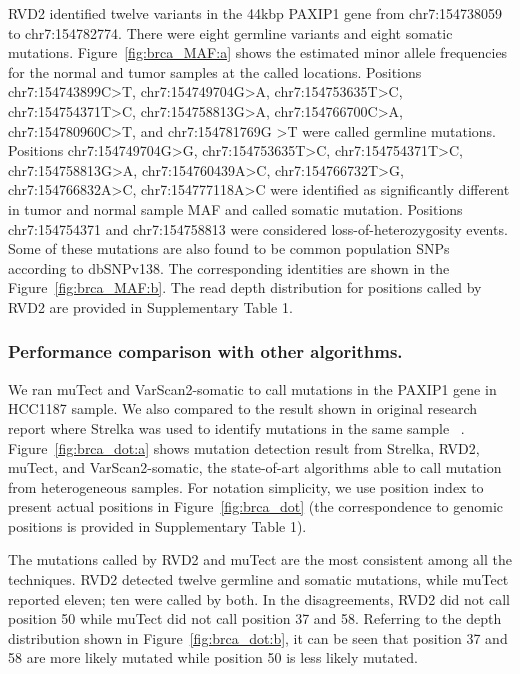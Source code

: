 \documentclass{bioinfo}
\begin{document}
RVD2 identified twelve variants in the 44kbp PAXIP1 gene from chr7:154738059 to chr7:154782774. There were eight germline variants and eight somatic mutations. %
Figure~\ref{fig:brca_MAF:a} shows the estimated minor allele frequencies for the normal and tumor samples at the called locations. Positions chr7:154743899C\textgreater T, chr7:154749704G\textgreater A, chr7:154753635T\textgreater C, chr7:154754371T\textgreater C, chr7:154758813G\textgreater A, chr7:154766700C\textgreater A, chr7:154780960C\textgreater T, and chr7:154781769G \textgreater T were called germline mutations. Positions chr7:154749704G\textgreater G, chr7:154753635T\textgreater C, chr7:154754371T\textgreater C, chr7:154758813G\textgreater A, chr7:154760439A\textgreater C, chr7:154766732T\textgreater G,  chr7:154766832A\textgreater C, chr7:154777118A\textgreater C were identified as significantly different in tumor and normal sample MAF and called somatic mutation. Positions chr7:154754371 and chr7:154758813 were considered loss-of-heterozygosity events. Some of these mutations are also found to be common population SNPs according to dbSNPv138. The corresponding identities are shown in the Figure~\ref{fig:brca_MAF:b}. The read depth distribution for positions called by RVD2 are provided in Supplementary Table 1. 

\subsubsection{Performance comparison with other algorithms.}

We ran muTect and VarScan2-somatic to call mutations in the PAXIP1 gene in HCC1187 sample. We also compared to the result shown in original research report where Strelka was used to identify mutations in the same sample ~\citep{hcc1187techreport}. Figure~\ref{fig:brca_dot:a} shows mutation detection result from Strelka, RVD2, muTect, and VarScan2-somatic, the state-of-art algorithms able to call mutation from heterogeneous samples. For notation simplicity, we use position index to present actual positions in Figure~\ref{fig:brca_dot} (the correspondence to genomic positions is provided in Supplementary Table 1). 

The mutations called by RVD2 and muTect are the most consistent among all the techniques. RVD2 detected twelve germline and somatic mutations, while muTect reported eleven; ten were called by both. In the disagreements, RVD2 did not call position 50 while muTect did not call position 37 and 58. Referring to the depth distribution shown in Figure~\ref{fig:brca_dot:b}, it can be seen that position 37 and 58 are more likely mutated while position 50 is less likely mutated. 
\end{document}

